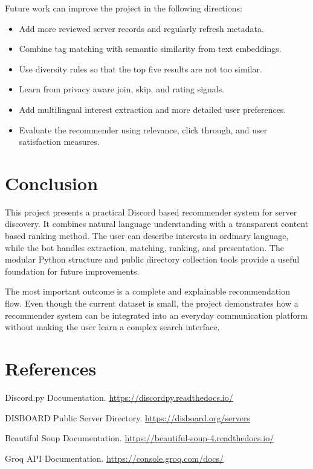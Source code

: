 \documentclass[11pt,a4paper]{article}
\begin{document}
Future work can improve the project in the following directions:
\begin{itemize}
    \item Add more reviewed server records and regularly refresh metadata.
    \item Combine tag matching with semantic similarity from text embeddings.
    \item Use diversity rules so that the top five results are not too similar.
    \item Learn from privacy aware join, skip, and rating signals.
    \item Add multilingual interest extraction and more detailed user preferences.
    \item Evaluate the recommender using relevance, click through, and user satisfaction measures.
\end{itemize}

\section{Conclusion}

This project presents a practical Discord based recommender system for server discovery. It combines natural language understanding with a transparent content based ranking method. The user can describe interests in ordinary language, while the bot handles extraction, matching, ranking, and presentation. The modular Python structure and public directory collection tools provide a useful foundation for future improvements.

The most important outcome is a complete and explainable recommendation flow. Even though the current dataset is small, the project demonstrates how a recommender system can be integrated into an everyday communication platform without making the user learn a complex search interface.

\section*{References}
\begin{enumerate}[label={[\arabic*]}]
    \item Discord.py Documentation. \url{https://discordpy.readthedocs.io/}
    \item DISBOARD Public Server Directory. \url{https://disboard.org/servers}
    \item Beautiful Soup Documentation. \url{https://beautiful-soup-4.readthedocs.io/}
    \item Groq API Documentation. \url{https://console.groq.com/docs/}
\end{enumerate}
\end{document}
